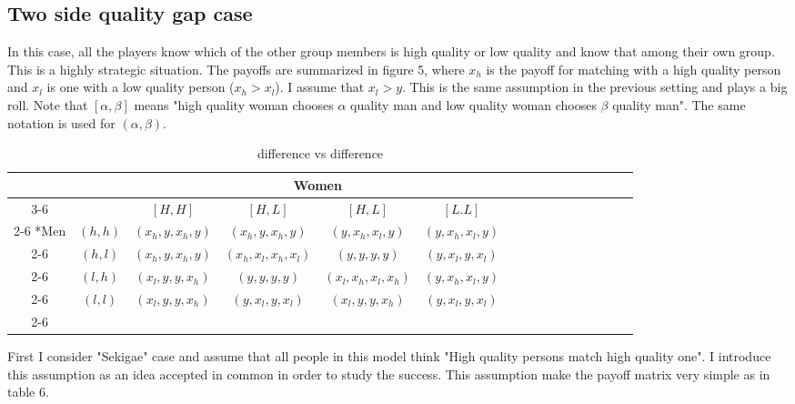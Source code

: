 \documentclass{article}
\begin{document}
	\subsection{Two side quality gap case}
	In this case, all the players know which of the other group members is high quality or low quality and know that among their own group. This is a highly strategic situation. The payoffs are summarized in figure 5, where $x_h$ is the payoff for matching with a high quality person and $x_l$ is one with a low quality person ($x_h > x_l$). I assume that $x_l > y$. This is the same assumption in the previous setting and plays a big roll. Note that $[\alpha, \beta]$ means "high quality woman chooses $\alpha$ quality man and low quality woman chooses $\beta$ quality man". The same notation is used for $(\alpha, \beta)$.
	
	\begin{table}[h]
	\begin{center}
                \setlength{\extrarowheight}{2pt}
                \begin{tabular}{*{16}{c|}}
                  \multicolumn{2}{c}{} & \multicolumn{1}{c}{} & \multicolumn{2}{c}{Women}\\\cline{3-6}
                  \multicolumn{1}{c}{} &  & $[H, H]$  & $[H, L]$ & $[H, L]$ & $[L.L]$\\\cline{2-6}
                  \multirow{4}*{Men}  & $(h,h)$ & $(x_h,y,x_h,y)$ & $(x_h,y,x_h,y)$ & $(y,x_h,x_l,y)$ & $(y,x_h,x_l,y)$\\\cline{2-6}
                  & $(h,l)$ & $(x_h,y,x_h,y)$ & $(x_h,x_l,x_h,x_l)$ & $(y,y,y,y)$ & $(y,x_l,y,x_l)$\\\cline{2-6}
                  & $(l,h)$ & $(x_l,y,y,x_h)$ & $(y,y,y,y)$ & $(x_l,x_h,x_l,x_h)$ & $(y,x_h,x_l,y)$\\\cline{2-6}
                  & $(l,l)$ & $(x_l,y,y,x_h)$ & $(y,x_l,y,x_l)$ & $(x_l,y,y,x_h)$ & $(y,x_l,y,x_l)$\\\cline{2-6}
                \end{tabular}
        \end{center}
        \caption{difference vs difference}
  	\end{table}

	\par
	First I consider "Sekigae" case and assume that all people in this model think "High quality persons match high quality one". I introduce this assumption as an idea accepted in common in order to study the success. This assumption make the payoff matrix very simple as in table 6.
	
\end{document}
